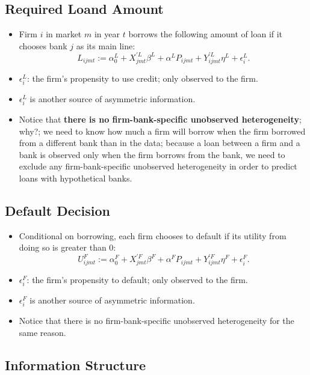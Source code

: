\documentclass[]{book}
\providecommand{\tightlist}{%
  \setlength{\itemsep}{0pt}\setlength{\parskip}{0pt}}
\begin{document}
\subsection{Required Loand Amount}\label{required-loand-amount}

\begin{itemize}
\tightlist
\item
  Firm \(i\) in market \(m\) in year \(t\) borrows the following amount
  of loan if it chooses bank \(j\) as its main line: \[
  L_{ijmt} := \alpha_0^L + X_{jmt}^{\prime L} \beta^L + \alpha^L P_{ijmt} + Y_{ijmt}^{\prime L} \eta^L + \epsilon_i^L.
  \]
\item
  \(\epsilon_i^L\): the firm's propensity to use credit; only observed
  to the firm.
\item
  \(\epsilon_i^L\) is another source of asymmetric information.
\item
  Notice that \textbf{there is no firm-bank-specific unobserved
  heterogeneity}; why?; we need to know how much a firm will borrow when
  the firm borrowed from a different bank than in the data; because a
  loan between a firm and a bank is observed only when the firm borrows
  from the bank, we need to exclude any firm-bank-specific unobserved
  heterogeneity in order to predict loans with hypothetical banks.
\end{itemize}

\subsection{Default Decision}\label{default-decision}

\begin{itemize}
\tightlist
\item
  Conditional on borrowing, each firm chooses to default if its utility
  from doing so is greater than 0: \[
  U_{ijmt}^F := \alpha_0^F + X_{jmt}^{\prime F} \beta^F + \alpha^F P_{ijmt} + Y_{ijmt}^{\prime F} \eta^F + \epsilon_i^F.
  \]
\item
  \(\epsilon_i^F\): the firm's propensity to default; only observed to
  the firm.
\item
  \(\epsilon_i^F\) is another source of asymmetric information.
\item
  Notice that there is no firm-bank-specific unobserved heterogeneity
  for the same reason.
\end{itemize}

\subsection{Information Structure}\label{information-structure}
\end{document}
